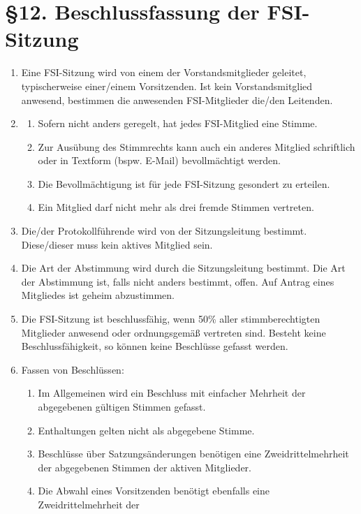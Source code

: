 \documentclass[12pt]{article}
\begin{document}
\section*{§12. Beschlussfassung der FSI-Sitzung}
\label{12}
\begin{enumerate}

	\item
	Eine FSI-Sitzung wird von einem der Vorstandsmitglieder geleitet, typischerweise einer/einem Vorsitzenden. Ist kein Vorstandsmitglied anwesend,
	bestimmen die anwesenden FSI-Mitglieder die/den Leitenden.
	\item
	\begin{enumerate}[label=(\roman*)]
		\item
		Sofern nicht anders geregelt, hat jedes FSI-Mitglied eine Stimme.
		\item
		Zur Ausübung des Stimmrechts kann auch ein
		anderes Mitglied schriftlich oder in Textform
		(bspw. E-Mail) bevollmächtigt werden.
		\item
		Die Bevollmächtigung ist für jede
		FSI-Sitzung gesondert zu erteilen.
		\item
		Ein Mitglied darf nicht mehr als drei
		fremde Stimmen vertreten.
	\end{enumerate}
	\item
	Die/der Protokollführende wird von der Sitzungsleitung bestimmt.
	Diese/dieser muss kein aktives Mitglied sein.
	\item
	Die Art der Abstimmung wird durch die Sitzungsleitung bestimmt. Die Art der Abstimmung
	ist, falls nicht anders bestimmt, offen. Auf Antrag eines
	Mitgliedes ist geheim abzustimmen.
	\item
	Die FSI-Sitzung ist beschlussfähig, wenn 50\%
	aller stimmberechtigten Mitglieder anwesend oder
	ordnungsgemäß vertreten sind. Besteht keine Beschlussfähigkeit,
	so können keine Beschlüsse gefasst werden.
	\item
	Fassen von Beschlüssen:
	\begin{enumerate}[label=(\roman*)]
		\item
		Im Allgemeinen wird ein Beschluss mit einfacher
		Mehrheit der abgegebenen gültigen Stimmen
		gefasst.
		\item
		Enthaltungen gelten nicht als abgegebene Stimme.
		\item
		Beschlüsse über Satzungsänderungen benötigen
		eine Zweidrittelmehrheit der abgegebenen
		Stimmen der aktiven Mitglieder.
		\item
		Die Abwahl eines Vorsitzenden benötigt
		ebenfalls eine Zweidrittelmehrheit der

\end{enumerate}
\end{enumerate}
\end{document}
